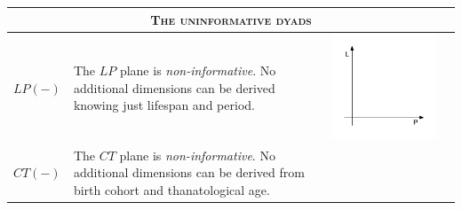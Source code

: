 \documentclass[12pt,oneside,letter]{article} %
\begin{document}
\begin{center}
\begin{longtable}{m{}m{}m{}m{}}
  \midrule
  \multicolumn{4}{c}{\textsc{The uninformative dyads}} \\
  \midrule
  $LP(-)$ &
  The $LP$ plane is \emph{non-informative}. No additional dimensions can be derived knowing just lifespan and period. &
  \includegraphics[width = \linewidth]{Figures/JonasTable/LP.pdf} & \\
  \midrule
  $CT(-)$ &
  The $CT$ plane is \emph{non-informative}. No additional dimensions can be
  derived from birth cohort and thanatological age. & \includegraphics[width =

\end{longtable}
\end{center}
\end{document}
